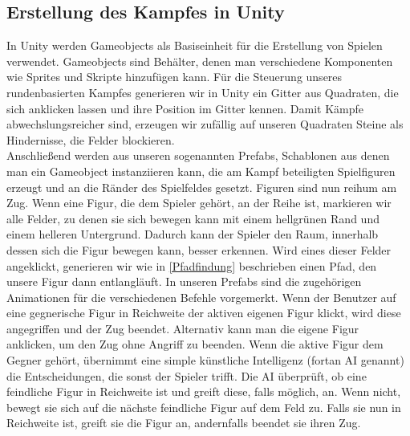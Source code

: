 \documentclass[extern,palatino]{cgBA}
\begin{document}
\subsection{Erstellung des Kampfes in Unity}
In Unity werden Gameobjects als Basiseinheit für die Erstellung von Spielen verwendet. Gameobjects sind Behälter, denen man verschiedene Komponenten wie Sprites und Skripte hinzufügen kann. %
Für die Steuerung unseres rundenbasierten Kampfes generieren wir in Unity ein Gitter aus Quadraten, die sich anklicken lassen und ihre Position im Gitter kennen. Damit Kämpfe abwechslungsreicher sind, erzeugen wir zufällig auf unseren Quadraten Steine als Hindernisse, die Felder blockieren.\\ Anschließend werden aus unseren sogenannten Prefabs, Schablonen aus denen man ein Gameobject instanziieren kann, die am Kampf beteiligten Spielfiguren erzeugt und an die Ränder des Spielfeldes gesetzt. Figuren sind nun reihum am Zug. Wenn eine Figur, die dem Spieler gehört, an der Reihe ist, markieren wir alle Felder, zu denen sie sich bewegen kann mit einem hellgrünen Rand und einem helleren Untergrund. Dadurch kann der Spieler den Raum, innerhalb dessen sich die Figur bewegen kann, besser erkennen. Wird eines dieser Felder angeklickt, generieren wir wie in \ref{Pfadfindung} beschrieben einen Pfad, den unsere Figur dann entlangläuft. In unseren Prefabs sind die zugehörigen Animationen für die verschiedenen Befehle vorgemerkt. Wenn der Benutzer auf eine gegnerische Figur in Reichweite der aktiven eigenen Figur klickt, wird diese angegriffen und der Zug beendet. Alternativ kann man die eigene Figur anklicken, um den Zug ohne Angriff zu beenden. Wenn die aktive Figur dem Gegner gehört, übernimmt eine simple künstliche Intelligenz (fortan AI genannt) die Entscheidungen, die sonst der Spieler trifft. Die AI überprüft, ob eine feindliche Figur in Reichweite ist und greift diese, falls möglich, an. Wenn nicht, bewegt sie sich auf die nächste feindliche Figur auf dem Feld zu. Falls sie nun in Reichweite ist, greift sie die Figur an, andernfalls beendet sie ihren Zug.
\end{document}
